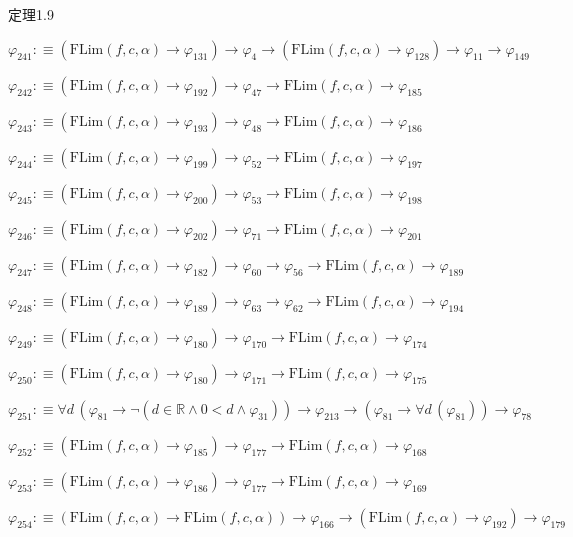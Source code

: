 \begin{fullproof}{定理1.9}
\begin{abbrevlist}
\item $\varphi_{241} :\equiv (\mathrm{FLim}(f,c,\alpha) \to \varphi_{131}) \to \varphi_{4} \to (\mathrm{FLim}(f,c,\alpha) \to \varphi_{128}) \to \varphi_{11} \to \varphi_{149}$
\item $\varphi_{242} :\equiv (\mathrm{FLim}(f,c,\alpha) \to \varphi_{192}) \to \varphi_{47} \to \mathrm{FLim}(f,c,\alpha) \to \varphi_{185}$
\item $\varphi_{243} :\equiv (\mathrm{FLim}(f,c,\alpha) \to \varphi_{193}) \to \varphi_{48} \to \mathrm{FLim}(f,c,\alpha) \to \varphi_{186}$
\item $\varphi_{244} :\equiv (\mathrm{FLim}(f,c,\alpha) \to \varphi_{199}) \to \varphi_{52} \to \mathrm{FLim}(f,c,\alpha) \to \varphi_{197}$
\item $\varphi_{245} :\equiv (\mathrm{FLim}(f,c,\alpha) \to \varphi_{200}) \to \varphi_{53} \to \mathrm{FLim}(f,c,\alpha) \to \varphi_{198}$
\item $\varphi_{246} :\equiv (\mathrm{FLim}(f,c,\alpha) \to \varphi_{202}) \to \varphi_{71} \to \mathrm{FLim}(f,c,\alpha) \to \varphi_{201}$
\item $\varphi_{247} :\equiv (\mathrm{FLim}(f,c,\alpha) \to \varphi_{182}) \to \varphi_{60} \to \varphi_{56} \to \mathrm{FLim}(f,c,\alpha) \to \varphi_{189}$
\item $\varphi_{248} :\equiv (\mathrm{FLim}(f,c,\alpha) \to \varphi_{189}) \to \varphi_{63} \to \varphi_{62} \to \mathrm{FLim}(f,c,\alpha) \to \varphi_{194}$
\item $\varphi_{249} :\equiv (\mathrm{FLim}(f,c,\alpha) \to \varphi_{180}) \to \varphi_{170} \to \mathrm{FLim}(f,c,\alpha) \to \varphi_{174}$
\item $\varphi_{250} :\equiv (\mathrm{FLim}(f,c,\alpha) \to \varphi_{180}) \to \varphi_{171} \to \mathrm{FLim}(f,c,\alpha) \to \varphi_{175}$
\item $\varphi_{251} :\equiv \forall d\,(\varphi_{81} \to \neg (d \in \mathbb{R} \land 0 < d \land \varphi_{31})) \to \varphi_{213} \to (\varphi_{81} \to \forall d\,(\varphi_{81})) \to \varphi_{78}$
\item $\varphi_{252} :\equiv (\mathrm{FLim}(f,c,\alpha) \to \varphi_{185}) \to \varphi_{177} \to \mathrm{FLim}(f,c,\alpha) \to \varphi_{168}$
\item $\varphi_{253} :\equiv (\mathrm{FLim}(f,c,\alpha) \to \varphi_{186}) \to \varphi_{177} \to \mathrm{FLim}(f,c,\alpha) \to \varphi_{169}$
\item $\varphi_{254} :\equiv (\mathrm{FLim}(f,c,\alpha) \to \mathrm{FLim}(f,c,\alpha)) \to \varphi_{166} \to (\mathrm{FLim}(f,c,\alpha) \to \varphi_{192}) \to \varphi_{179}$

\end{abbrevlist}
\end{fullproof}
